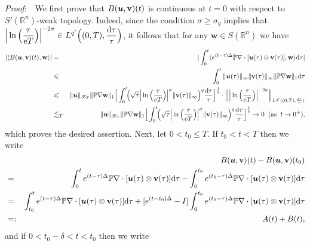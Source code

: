 \documentclass[11pt]{article}
\newcommand{\rmd}{\mbox{\rm d}}
\newcommand{\bfu}{{\mbox{\boldmath $u$}}}
\newcommand{\rme}{{\rm e}}
\begin{document}
  {\em Proof}:\ \  We first prove that $B(\bfu,\mathbf{v})(t)$ is continuous at $t=0$ with respect to $S'(\mathbb{R}^n)$-weak topology. Indeed, since
  the condition $\sigma\geqslant\sigma_q$ implies that $\displaystyle\Big|\ln\Big(\frac{\tau}{\rme T}\Big)\Big|^{-2\sigma}\in L^{q'}\Big((0,T),
  \frac{\rmd\tau}{\tau}\Big)$, it follows that for any $\mathbf{w}\in S(\mathbb{R}^n)$ we have
\begin{eqnarray*}
  |\langle B(\bfu,\mathbf{v})(t),\mathbf{w}\rangle|
  &=&|\int_0^t\langle e^{(t-\tau)\Delta}\mathbb{P}\nabla\cdot[\bfu(\tau)\otimes\mathbf{v}(\tau)],\mathbf{w}\rangle \rmd\tau|
\\
  &\leqslant&\int_0^t\|\bfu(\tau)\|_{\infty}\|\mathbf{v}(\tau)\|_{\infty}\|\mathbb{P}\nabla\mathbf{w}\|_{1} \rmd\tau
\\
  &\leqslant&\|\bfu\|_{\mathscr{X}_T}\|\mathbb{P}\nabla\mathbf{w}\|_{1}\Big[\int_0^t\!\!\Big(\sqrt{\tau}
  \Big|\ln\Big(\frac{\tau}{\rme T}\Big)\Big|^{\sigma}\|\mathbf{v}(\tau)\|_{\infty}\Big)^q\frac{\rmd\tau}{\tau}\Big]^{\frac{1}{q}}
  \cdot\Big\|\Big|\ln\Big(\frac{\tau}{\rme T}\Big)\Big|^{-2\sigma}\Big\|_{L^{q'}((0,T),\frac{d\tau}{\tau})}
\\
  &\lesssim _T&\|\bfu\|_{\mathscr{X}_T}\|\mathbb{P}\nabla\mathbf{w}\|_{1}\Big[\int_0^t\!\!\Big(\sqrt{\tau}
  \Big|\ln\Big(\frac{\tau}{\rme T}\Big)\Big|^{\sigma}\|\mathbf{v}(\tau)\|_{\infty}\Big)^q\frac{\rmd\tau}{\tau}\Big]^{\frac{1}{q}}\to 0 \;\;
  (\mbox{as}\;\; t\to 0^+),
\end{eqnarray*}
  which proves the desired assertion. Next, let $0<t_0\leq T$. If $t_0<t<T$ then we write
\begin{eqnarray}
  &&B(\bfu,\mathbf{v})(t)-B(\bfu,\mathbf{v})(t_0)
\nonumber\\
  &=&\int_0^t e^{(t-\tau)\Delta}\mathbb{P}\nabla\cdot[\bfu(\tau)\otimes\mathbf{v}(\tau)]\rmd\tau
  -\int_0^{t_0}e^{(t_0-\tau)\Delta}\mathbb{P}\nabla\cdot[\bfu(\tau)\otimes\mathbf{v}(\tau)]\rmd\tau
\nonumber\\
  &=&\int_{t_0}^t e^{(t-\tau)\Delta}\mathbb{P}\nabla\cdot[\bfu(\tau)\otimes\mathbf{v}(\tau)]\rmd\tau
  +[e^{(t-t_0)\Delta}-I]\int_0^{t_0}e^{(t_0-\tau)\Delta}\mathbb{P}\nabla\cdot[\bfu(\tau)\otimes\mathbf{v}(\tau)]\rmd\tau
\nonumber\\
  &=:& A(t)+B(t),
\end{eqnarray}
  and if $0<t_0-\delta<t<t_0$ then we write
\end{document}
